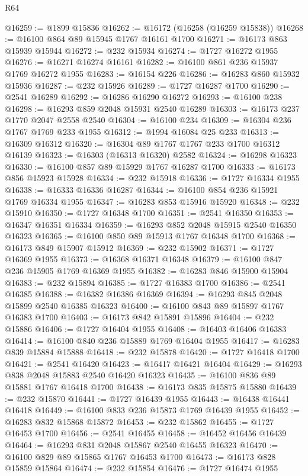 \begin{lexlean}{R64}
\begin{coremodule}
@16259 := @1899 @15836
@16262 := @16172 (@16258 (@16259 @15838))
@16268 := @16100 @864 @89 @15945 @1767 @16161 @1700
@16271 := @16173 @863 @15939 @15944
@16272 := @232 @15934
@16274 := @1727 @16272 @1955
@16276 := @16271 @16274 @16161
@16282 := @16100 @861 @236 @15937 @1769 @16272 @1955
@16283 := @16154 @226
@16286 := @16283 @860 @15932 @15936
@16287 := @232 @15926
@16289 := @1727 @16287 @1700
@16290 := @2541 @16289
@16292 := @16286 @16290 @16272
@16293 := @16100 @238
@16298 := @16293 @859 @2048 @15931 @2540 @16289
@16303 := @16173 @237 @1770 @2047 @2558 @2540
@16304 := @16100 @234
@16309 := @16304 @236 @1767 @1769 @233 @1955
@16312 := @1994 @16084 @25 @233
@16313 := @16309 @16312
@16320 := @16304 @89 @1767 @1767 @233 @1700 @16312 @16139
@16323 := @16303 (@16313 @16320) @2582
@16324 := @16298 @16323
@16330 := @16100 @857 @89 @15929 @1767 @16287 @1700
@16333 := @16173 @856 @15923 @15928
@16334 := @232 @15918
@16336 := @1727 @16334 @1955
@16338 := @16333 @16336 @16287
@16344 := @16100 @854 @236 @15921 @1769 @16334 @1955
@16347 := @16283 @853 @15916 @15920
@16348 := @232 @15910
@16350 := @1727 @16348 @1700
@16351 := @2541 @16350
@16353 := @16347 @16351 @16334
@16359 := @16293 @852 @2048 @15915 @2540 @16350 @16323
@16365 := @16100 @850 @89 @15913 @1767 @16348 @1700
@16368 := @16173 @849 @15907 @15912
@16369 := @232 @15902
@16371 := @1727 @16369 @1955
@16373 := @16368 @16371 @16348
@16379 := @16100 @847 @236 @15905 @1769 @16369 @1955
@16382 := @16283 @846 @15900 @15904
@16383 := @232 @15894
@16385 := @1727 @16383 @1700
@16386 := @2541 @16385
@16388 := @16382 @16386 @16369
@16394 := @16293 @845 @2048 @15899 @2540 @16385 @16323
@16400 := @16100 @843 @89 @15897 @1767 @16383 @1700
@16403 := @16173 @842 @15891 @15896
@16404 := @232 @15886
@16406 := @1727 @16404 @1955
@16408 := @16403 @16406 @16383
@16414 := @16100 @840 @236 @15889 @1769 @16404 @1955
@16417 := @16283 @839 @15884 @15888
@16418 := @232 @15878
@16420 := @1727 @16418 @1700
@16421 := @2541 @16420
@16423 := @16417 @16421 @16404
@16429 := @16293 @838 @2048 @15883 @2540 @16420 @16323
@16435 := @16100 @836 @89 @15881 @1767 @16418 @1700
@16438 := @16173 @835 @15875 @15880
@16439 := @232 @15870
@16441 := @1727 @16439 @1955
@16443 := @16438 @16441 @16418
@16449 := @16100 @833 @236 @15873 @1769 @16439 @1955
@16452 := @16283 @832 @15868 @15872
@16453 := @232 @15862
@16455 := @1727 @16453 @1700
@16456 := @2541 @16455
@16458 := @16452 @16456 @16439
@16464 := @16293 @831 @2048 @15867 @2540 @16455 @16323
@16470 := @16100 @829 @89 @15865 @1767 @16453 @1700
@16473 := @16173 @828 @15859 @15864
@16474 := @232 @15854
@16476 := @1727 @16474 @1955

\end{coremodule}
\end{lexlean}
